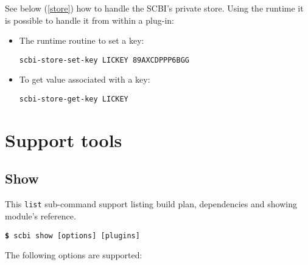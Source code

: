 \documentclass[a4paper,12pt,twoside]{article}
\newcommand{\code}[1]{\texttt{#1}}
\newcommand{\cmd}[1]{\tabto{1cm}\hspace{0.5cm}\texttt{\textbf{\$} #1}}
\let\stdsection\section
\renewcommand\section{\newpage\stdsection}
\begin{document}
See below (\ref{store}) how to handle the SCBI's private store. Using the runtime it is possible to handle it from within a plug-in:

\begin{itemize}
	\item The runtime routine to set a key:

	\hspace{1.5cm}\texttt{scbi-store-set-key LICKEY 89AXCDPPP6BGG}

	\item To get value associated with a key:

	\hspace{1.5cm}\texttt{scbi-store-get-key LICKEY}
\end{itemize}


\section{Support tools}

\subsection{Show}
\label{listing}
\label{show}

This \code{list} sub-command support listing build plan,  dependencies and showing module's reference.

\cmd{scbi show [options] [plugins]}

The following options are supported:
\end{document}
